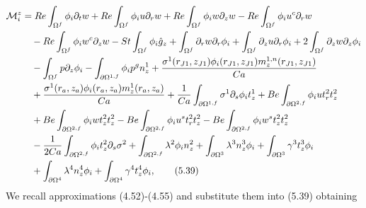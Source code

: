 \documentclass{article}
\begin{document}
\begin{align}
\mathcal{M}_i^z &= Re \int_{\Omega^f} \phi_i \partial_t w + Re \int_{\Omega^f} \phi_i u \partial_r w + Re \int_{\Omega^f} \phi_i w \partial_z w - Re \int_{\Omega^f} \phi_i u^c \partial_r w \nonumber\\
&\quad - Re \int_{\Omega^f} \phi_i w^c \partial_z w - St \int_{\Omega^f} \phi_i \hat{g}_z + \int_{\Omega^f} \partial_r w \partial_r \phi_i + \int_{\Omega^f} \partial_z u \partial_r \phi_i + 2 \int_{\Omega^f} \partial_z w \partial_z \phi_i \nonumber\\
&\quad - \int_{\Omega^f} p \partial_z \phi_i - \int_{\partial \Omega^{1,f}} \phi_i p^g n_z^1 + \frac{\sigma^1(r_{J1},z_{J1}) \phi_i(r_{J1},z_{J1}) m_z^{1,n}(r_{J1},z_{J1})}{Ca} \nonumber\\
&\quad + \frac{\sigma^1(r_a,z_a) \phi_i(r_a,z_a) m_z^{1}(r_a,z_a)}{Ca} + \frac{1}{Ca} \int_{\partial \Omega^{1,f}} \sigma^1 \partial_s \phi_i t_z^1 + Be \int_{\partial \Omega^{2,f}} \phi_i u t_r^2 t_z^2 \nonumber\\
&\quad + Be \int_{\partial \Omega^{2,f}} \phi_i w t_z^2 t_z^2 - Be \int_{\partial \Omega^{2,f}} \phi_i u^s t_r^2 t_z^2 - Be \int_{\partial \Omega^{2,f}} \phi_i w^s t_z^2 t_z^2 \nonumber\\
&\quad - \frac{1}{2Ca} \int_{\partial \Omega^{2,f}} \phi_i t_z^2 \partial_s \sigma^2 + \int_{\partial \Omega^{2,f}} \lambda^2 \phi_i n_z^2 + \int_{\partial \Omega^{3}} \lambda^3 n_z^3 \phi_i + \int_{\partial \Omega^{3}} \gamma^3 t_z^3 \phi_i \nonumber\\
&\quad + \int_{\partial \Omega^{4}} \lambda^4 n_z^4 \phi_i + \int_{\partial \Omega^{4}} \gamma^4 t_z^4 \phi_i, \tag{5.39}
\end{align}
We recall approximations (4.52)-(4.55) and substitute them into (5.39) obtaining
\end{document}
